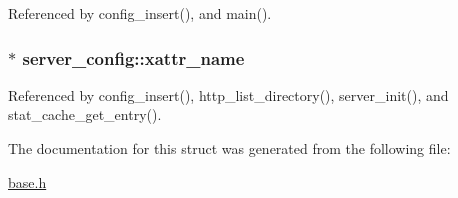 Referenced by config\-\_\-insert(), and main().

\hypertarget{structserver__config_a4e4ddccc2ac172d7ee15d6d1556c4d65}{
\subsubsection[{xattr\-\_\-name}]{$\ast$ server\-\_\-config\-::xattr\-\_\-name}}\label{structserver__config_a4e4ddccc2ac172d7ee15d6d1556c4d65}


Referenced by config\-\_\-insert(), http\-\_\-list\-\_\-directory(), server\-\_\-init(), and stat\-\_\-cache\-\_\-get\-\_\-entry().



The documentation for this struct was generated from the following file\-:\begin{DoxyCompactItemize}
\item 
\hyperlink{base_8h}{base.\-h}\end{DoxyCompactItemize}
